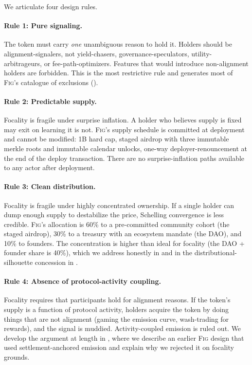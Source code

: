 \documentclass[11pt,a4paper]{article}
\theoremstyle{definition}
\theoremstyle{remark}
\newcommand{\fig}{\textsc{Fig}}
\begin{document}
We articulate four design rules.

\paragraph{Rule 1: Pure signaling.}
The token must carry \emph{one} unambiguous reason to hold it.
Holders should be alignment-signalers, not yield-chasers,
governance-speculators, utility-arbitrageurs, or
fee-path-optimizers. Features that would introduce non-alignment
holders are forbidden. This is the most restrictive rule and
generates most of \fig{}'s catalogue of exclusions
().

\paragraph{Rule 2: Predictable supply.}
Focality is fragile under surprise inflation. A holder who
believes supply is fixed may exit on learning it is not.
\fig{}'s supply schedule is committed at deployment and cannot
be modified: 1B hard cap, staged airdrop with three immutable
merkle roots and immutable calendar unlocks, one-way
deployer-renouncement at the end of the deploy transaction. There
are no surprise-inflation paths available to any actor after
deployment.

\paragraph{Rule 3: Clean distribution.}
Focality is fragile under highly concentrated ownership. If a
single holder can dump enough supply to destabilize the price,
Schelling convergence is less credible. \fig{}'s allocation is
60\% to a pre-committed community cohort (the staged airdrop),
30\% to a treasury with an ecosystem mandate (the DAO), and 10\%
to founders. The concentration is higher than ideal for
focality (the DAO + founder share is 40\%), which we address
honestly in  and in the
distributional-silhouette concession in
.

\paragraph{Rule 4: Absence of protocol-activity coupling.}
Focality requires that participants hold for alignment reasons.
If the token's supply is a function of protocol activity,
holders acquire the token by doing things that are not alignment
(gaming the emission curve, wash-trading for rewards), and the
signal is muddied. Activity-coupled emission is ruled out. We
develop the argument at length in , where we
describe an earlier \fig{} design that used settlement-anchored
emission and explain why we rejected it on focality grounds.
\end{document}
